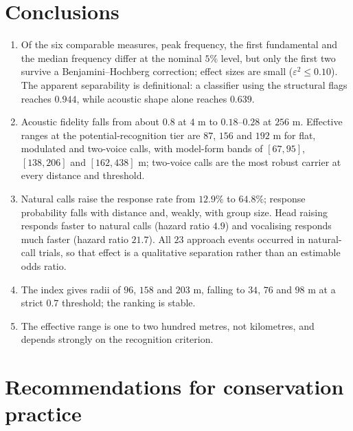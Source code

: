 \documentclass{apmcmthesis}
\begin{document}
\section{Conclusions}\label{sec:concl}

\begin{enumerate}[label=\textbf{(\arabic*)},leftmargin=*]
\item Of the six comparable measures, peak frequency, the first fundamental and the
median frequency differ at the nominal $5\%$ level, but only the first two survive a
Benjamini--Hochberg correction; effect sizes are small ($\varepsilon^2\le0.10$). The
apparent separability is definitional: a classifier using the structural flags reaches
$0.944$, while acoustic shape alone reaches $0.639$.

\item Acoustic fidelity falls from about $0.8$ at $4$ m to $0.18$--$0.28$ at $256$ m.
Effective ranges at the potential-recognition tier are $87$, $156$ and $192$ m for flat,
modulated and two-voice calls, with model-form bands of $[67,95]$, $[138,206]$ and
$[162,438]$ m; two-voice calls are the most robust carrier at every distance and threshold.

\item Natural calls raise the response rate from $12.9\%$ to $64.8\%$; response
probability falls with distance and, weakly, with group size. Head raising responds
faster to natural calls (hazard ratio $4.9$) and vocalising responds much faster (hazard
ratio $21.7$). All $23$ approach events occurred in natural-call trials, so that effect
is a qualitative separation rather than an estimable odds ratio.

\item The index gives radii of $96$, $158$ and $203$ m, falling to $34$, $76$ and $98$ m
at a strict $0.7$ threshold; the ranking is stable.

\item The effective range is one to two hundred metres, not kilometres, and depends
strongly on the recognition criterion.
\end{enumerate}

\section*{Recommendations for conservation practice}
\end{document}
